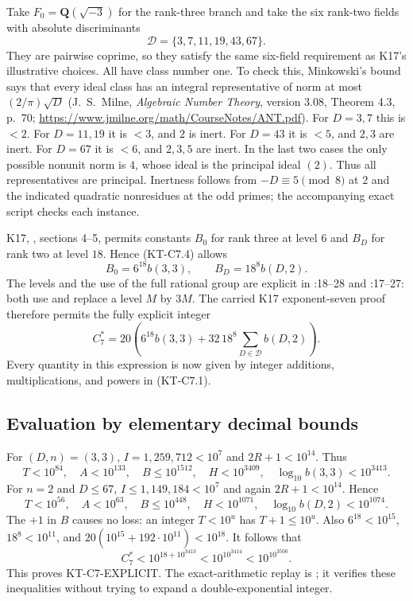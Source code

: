 \documentclass[11pt,a4paper]{article}
\theoremstyle{definition}
\begin{document}
Take $F_0=\mathbf Q(\sqrt{-3})$ for the rank-three branch and take
the six rank-two fields with absolute discriminants
\[
 \mathcal D=\{3,7,11,19,43,67\}.
\]
They are pairwise coprime, so they satisfy the same six-field
requirement as K17's illustrative choices.
All have class number one.  To check this, Minkowski's bound says
that every ideal class has an integral representative of norm at
most $(2/\pi)\sqrt D$ (J.~S.~Milne,
\emph{Algebraic Number Theory}, version 3.08, Theorem 4.3, p.~70;
\url{https://www.jmilne.org/math/CourseNotes/ANT.pdf}).
For $D=3,7$ this is $<2$.  For $D=11,19$ it is $<3$, and $2$ is
inert.  For $D=43$ it is $<5$, and $2,3$ are inert.  For $D=67$ it
is $<6$, and $2,3,5$ are inert.  In the last two cases the only
possible nonunit norm is $4$, whose ideal is the principal ideal
$(2)$.  Thus all representatives are principal.  Inertness follows
from $-D\equiv5\pmod8$ at $2$ and the indicated quadratic
nonresidues at the odd primes; the accompanying exact script checks
each instance.

K17, ,
sections 4--5, permits constants $B_0$ for rank three at level $6$
and $B_D$ for rank two at level $18$.  Hence (KT-C7.4) allows
\[
 B_0=6^{18}b(3,3),\qquad B_D=18^8b(D,2).
\tag{KT-C7.5}
\]
The levels and the use of the full rational group are explicit in
:18--28
and :17--27:
both use  and replace a level $M$ by
$3M$.  The carried K17 exponent-seven proof therefore permits the
fully explicit integer
\[
 C_7^*=20\left(6^{18}b(3,3)+32\,18^8
                 \sum_{D\in\mathcal D}b(D,2)\right).
\tag{KT-C7.6}
\]
Every quantity in this expression is now given by integer additions,
multiplications, and powers in (KT-C7.1).

\subsection{Evaluation by elementary decimal bounds}

For $(D,n)=(3,3)$, $I=1{,}259{,}712<10^7$ and $2R+1<10^{14}$.
Thus
\[
 T<10^{84},\quad A<10^{133},\quad B\le10^{1512},
 \quad H<10^{3409},\quad \log_{10}b(3,3)<10^{3413}.
\]
For $n=2$ and $D\le67$, $I\le1{,}149{,}184<10^7$ and again
$2R+1<10^{14}$.  Hence
\[
 T<10^{56},\quad A<10^{63},\quad B\le10^{448},
 \quad H<10^{1071},\quad \log_{10}b(D,2)<10^{1074}.
\]
The $+1$ in $B$ causes no loss: an integer $T<10^u$ has
$T+1\le10^u$.
Also $6^{18}<10^{15}$, $18^8<10^{11}$, and
$20(10^{15}+192\cdot10^{11})<10^{18}$.
It follows that
\[
 C_7^*<10^{18+10^{3413}}<10^{10^{3414}}<10^{10^{3500}}.
\]
This proves KT-C7-EXPLICIT.  The exact-arithmetic replay is
; it verifies these inequalities without
trying to expand a double-exponential integer.
\end{document}
